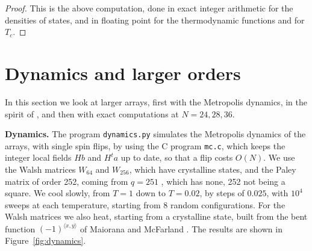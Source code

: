 \documentclass[11pt,a4paper]{article}
\theoremstyle{remark}
\begin{document}
\begin{proof}
This is the above computation, done in exact integer arithmetic for the densities of states, and in floating point for the thermodynamic functions and for $T_c$.
\end{proof}

\section{Dynamics and larger orders}\label{sec:larger}

In this section we look at larger arrays, first with the Metropolis dynamics, in the spirit of \cite{mp2,mp3}, and then with exact computations at $N=24,28,36$.

\medskip

\noindent\textbf{Dynamics.} The program \texttt{dynamics.py} simulates the Metropolis dynamics of the arrays, with single spin flips, by using the C program \texttt{mc.c}, which keeps the integer local fields $Hb$ and $H^ta$ up to date, so that a flip costs $O(N)$. We use the Walsh matrices $W_{64}$ and $W_{256}$, which have crystalline states, and the Paley matrix of order 252, coming from $q=251$ \cite{pal}, which has none, 252 not being a square. We cool slowly, from $T=1$ down to $T=0.02$, by steps of $0.025$, with $10^4$ sweeps at each temperature, starting from 8 random configurations. For the Walsh matrices we also heat, starting from a crystalline state, built from the bent function $(-1)^{\langle x,y\rangle}$ of Maiorana and McFarland \cite{tok}. The results are shown in Figure~\ref{fig:dynamics}.
\end{document}
